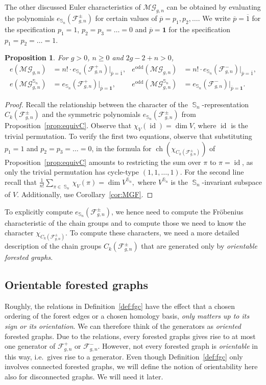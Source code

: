 \documentclass[oneside]{amsart}
\newtheorem{proposition}[theorem]{Proposition}
\theoremstyle{remark}
\newcommand{\bb}[1]{{\overline{#1}}}
\DeclareMathOperator{\SG}{{\mathbb S}}
\newcommand{\ch}{\operatorname{ch}}
\DeclareMathOperator{\id}{id}
\newcommand{\MG}{\mathcal{MG}}
\newcommand{\F}{\mathcal{F}}
\begin{document}
The other discussed Euler characteristics of $\MG_{g,n}$ can 
be obtained by evaluating the polynomials $e_{\SG_n}(\F_{g,n}^\pm)$ 
for certain values of $\bb p=p_1,p_2,\ldots$.
We write $\bb p = \bb 1$ for the specification $p_1=1$, $p_2=p_3=\ldots=0$
and $\bb p = \boldsymbol 1$ for the specification $p_1=p_2=\ldots=1$.
\begin{proposition}
\label{prop:MGF-special}
For $g > 0$,  $n\geq 0$ and $2g-2+n > 0$,
\begin{align*} e(\MG_{g,n}) &= n! \cdot e_{\SG_n}(\F_{g,n}^+) |_{\bb p = \bb 1}, & e^\mathrm{odd}(\MG_{g,n}) &= n! \cdot e_{\SG_n}(\F_{g,n}^-) |_{\bb p = \bb 1},\\
e(\MG_{g,n}^{\SG_n}) &= e_{\SG_n}(\F_{g,n}^+) |_{\bb p = \boldsymbol 1}, & e^\mathrm{odd}(\MG_{g,n}^{\SG_n}) &= e_{\SG_n}(\F_{g,n}^-) |_{\bb p = \boldsymbol 1}. \end{align*}
\end{proposition}
\begin{proof}
Recall the relationship between the character of the 
$\SG_n$-representation $C_k(\F_{g,n}^\pm)$ and the symmetric 
polynomials $e_{\SG_n}(\F_{g,n}^\pm)$ from 
Proposition~\ref{prop:equivC}.
Observe that
$\chi_{V}(\id) = \dim V$, where $\id$ is the trivial permutation.
To verify the first two equations, observe that substituting $p_1=1$ and $p_2=p_3=\ldots=0$,
in the formula for 
$ \ch(\chi_{C_k(\F^\pm_{g,n})}) $
of Proposition~\ref{prop:equivC}
amounts to restricting the sum over $\pi$ to $\pi = \id$,
as only the trivial permutation has cycle-type $(1,1,\ldots,1)$.
For the second line recall that 
$\frac{1}{n!} \sum_{\pi \in \SG_n} \chi_{V}(\pi) = \dim V^{\SG_n},$
where $V^{\SG_n}$ is the $\SG_n$-invariant subspace of $V$.
Additionally, use Corollary~\ref{cor:MGF}.
\end{proof}

%
To explicitly compute $e_{\SG_n}(\F^\pm_{g,n})$,
we hence need to compute the Fr\"obenius characteristic of the chain groups and to compute those we need to know the character $\chi_{C_k(\F^\pm_{g,n})}$.
To compute these characters, we need a more detailed description of the chain groups $C_k(\F^\pm_{g,n})$ that are generated only by 
\emph{orientable forested graphs}.

\subsection{Orientable forested graphs}
\label{sec:orient}

Roughly, the relations in Definition~\ref{def:fgc} have the effect that a chosen ordering of the forest edges or a chosen homology basis, \emph{only matters up to its sign or its orientation}. We can therefore think of the generators as \emph{oriented} forested graphs.
Due to the relations, every forested graphs gives rise to at most one generator of $\F_{g,n}^{+}$ or $\F_{g,n}^{-}$.
%
However, not every forested graph is \emph{orientable} in this way, i.e.~gives rise to a generator. 
%
%
Even though Definition~\ref{def:fgc} only involves connected forested graphs, we will define the notion of orientability here also for disconnected graphs. We will need it later.
\end{document}
